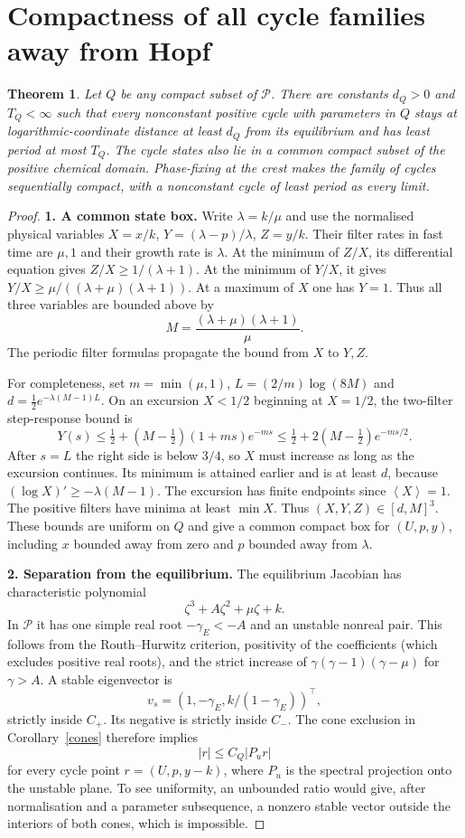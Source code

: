 \documentclass[11pt,a4paper]{article}
\newtheorem{theorem}{Theorem}[section]\newtheorem{lemma}[theorem]{Lemma}
\theoremstyle{remark}\newtheorem{remark}[theorem]{Remark}
\newcommand{\av}[1]{\left\langle #1\right\rangle}
\begin{document}
\section{Compactness of all cycle families away from Hopf}
\begin{theorem}\label{compactness}
Let $Q$ be any compact subset of $\mathcal P$. There are constants $d_Q>0$ and $T_Q<\infty$ such that every nonconstant positive cycle with parameters in $Q$ stays at logarithmic-coordinate distance at least $d_Q$ from its equilibrium and has least period at most $T_Q$. The cycle states also lie in a common compact subset of the positive chemical domain. Phase-fixing at the crest makes the family of cycles sequentially compact, with a nonconstant cycle of least period as every limit.
\end{theorem}
\begin{proof}
\textbf{1. A common state box.} Write $\lambda=k/\mu$ and use the normalised physical variables $X=x/k$, $Y=(\lambda-p)/\lambda$, $Z=y/k$. Their filter rates in fast time are $\mu,1$ and their growth rate is $\lambda$. At the minimum of $Z/X$, its differential equation gives $Z/X\ge1/(\lambda+1)$. At the minimum of $Y/X$, it gives $Y/X\ge\mu/((\lambda+\mu)(\lambda+1))$. At a maximum of $X$ one has $Y=1$. Thus all three variables are bounded above by
\[
 M=\frac{(\lambda+\mu)(\lambda+1)}\mu.
\]
The periodic filter formulas propagate the bound from $X$ to $Y,Z$.

For completeness, set $m=\min(\mu,1)$, $L=(2/m)\log(8M)$ and $d=\frac12e^{-\lambda(M-1)L}$. On an excursion $X<1/2$ beginning at $X=1/2$, the two-filter step-response bound is
\[
 Y(s)\le\tfrac12+(M-\tfrac12)(1+ms)e^{-ms}
 \le\tfrac12+2(M-\tfrac12)e^{-ms/2}.
\]
After $s=L$ the right side is below $3/4$, so $X$ must increase as long as the excursion continues. Its minimum is attained earlier and is at least $d$, because $(\log X)'\ge-\lambda(M-1)$. The excursion has finite endpoints since $\av{X}=1$. The positive filters have minima at least $\min X$. Thus $(X,Y,Z)\in[d,M]^3$. These bounds are uniform on $Q$ and give a common compact box for $(U,p,y)$, including $x$ bounded away from zero and $p$ bounded away from $\lambda$.

\textbf{2. Separation from the equilibrium.} The equilibrium Jacobian has characteristic polynomial
\[
 \zeta^3+A\zeta^2+\mu\zeta+k.
\]
In $\mathcal P$ it has one simple real root $-\gamma_E<-A$ and an unstable nonreal pair. This follows from the Routh--Hurwitz criterion, positivity of the coefficients (which excludes positive real roots), and the strict increase of $\gamma(\gamma-1)(\gamma-\mu)$ for $\gamma>A$. A stable eigenvector is
\[
 v_s=(1,-\gamma_E,k/(1-\gamma_E))^\top,
\]
strictly inside $C_+$. Its negative is strictly inside $C_-$. The cone exclusion in Corollary~\ref{cones} therefore implies
\begin{equation}\label{conebound}
 |r|\le C_Q|P_u r|
\end{equation}
for every cycle point $r=(U,p,y-k)$, where $P_u$ is the spectral projection onto the unstable plane. To see uniformity, an unbounded ratio would give, after normalisation and a parameter subsequence, a nonzero stable vector outside the interiors of both cones, which is impossible.


\end{proof}
\end{document}
